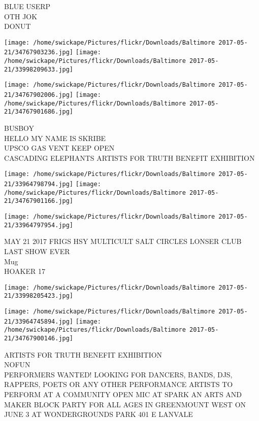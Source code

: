 \documentclass[10pt,letterpaper]{article}
\begin{document}
BLUE USERP\\
OTH JOK\\
DONUT\\
\pagebreak

\texttt{[image: /home/swickape/Pictures/flickr/Downloads/Baltimore 2017-05-21/34767903236.jpg]}
\texttt{[image: /home/swickape/Pictures/flickr/Downloads/Baltimore 2017-05-21/33998209633.jpg]}

\texttt{[image: /home/swickape/Pictures/flickr/Downloads/Baltimore 2017-05-21/34767902006.jpg]}
\texttt{[image: /home/swickape/Pictures/flickr/Downloads/Baltimore 2017-05-21/34767901686.jpg]}

BUSBOY\\
HELLO MY NAME IS SKRIBE\\
UPSCO GAS VENT KEEP OPEN\\
CASCADING ELEPHANTS ARTISTS FOR TRUTH BENEFIT EXHIBITION\\
\pagebreak

\texttt{[image: /home/swickape/Pictures/flickr/Downloads/Baltimore 2017-05-21/33964798794.jpg]}
\texttt{[image: /home/swickape/Pictures/flickr/Downloads/Baltimore 2017-05-21/34767901166.jpg]}

\vspace{0.25in}
\texttt{[image: /home/swickape/Pictures/flickr/Downloads/Baltimore 2017-05-21/33964797954.jpg]}

MAY 21 2017 FRIGS HSY MULTICULT SALT CIRCLES LONSER CLUB LAST SHOW EVER\\
Mug\\
HOAKER 17\\
\pagebreak

\texttt{[image: /home/swickape/Pictures/flickr/Downloads/Baltimore 2017-05-21/33998205423.jpg]}

\vspace{0.25in}
\texttt{[image: /home/swickape/Pictures/flickr/Downloads/Baltimore 2017-05-21/33964745894.jpg]}
\texttt{[image: /home/swickape/Pictures/flickr/Downloads/Baltimore 2017-05-21/34767900146.jpg]}

ARTISTS FOR TRUTH BENEFIT EXHIBITION\\
NOFUN\\
PERFORMERS WANTED!  LOOKING FOR DANCERS, BANDS, DJS, RAPPERS, POETS OR ANY OTHER PERFORMANCE ARTISTS TO PERFORM AT A COMMUNITY OPEN MIC AT SPARK AN ARTS AND MAKER BLOCK PARTY FOR ALL AGES IN GREENMOUNT WEST ON JUNE 3 AT WONDERGROUNDS PARK 401 E LANVALE\\
\pagebreak
\end{document}
